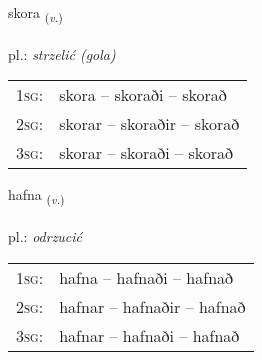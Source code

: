 \documentclass[frontgrid, backgrid]{flacards}\usepackage[]{graphicx}\usepackage[]{xcolor}
\begin{document}
\renewcommand{\flhead}{\vskip5pt \fboxsep=0pt {\small\bfseries\footnotesize Sagnorð | Verb}}
\renewcommand{\fcfoot}{\vskip5pt \fboxsep=0pt \hspace{2pt}{\small\bfseries\footnotesize 1K}}

\renewcommand{\blhead}{\vskip5pt {\small\bfseries\footnotesize Sagnorð | Verb }}
\renewcommand{\bcfoot}{\vskip5pt \hspace{2pt}{\small\bfseries\footnotesize 1K}}


{skora \small{\textsubscript{(\textit{v.})}} \\[1ex] %
\textphonetic{[skɔːra]} \\
pl.: \emph{strzelić (gola)} \\  [2ex]
\renewcommand*{\arraystretch}{0.8}
\begin{tabular}{p{1cm}l}
\textsc{1sg}: & skora -- skoraði -- skorað \\ 
\textsc{2sg}: & skorar -- skoraðir -- skorað \\ 
\textsc{3sg}: & skorar -- skoraði -- skorað \\ 
\end{tabular}
}

\renewcommand{\flhead}{\vskip5pt \fboxsep=0pt {\small\bfseries\footnotesize Sagnorð | Verb}}
\renewcommand{\fcfoot}{\vskip5pt \fboxsep=0pt \hspace{2pt}{\small\bfseries\footnotesize 1K}}

\renewcommand{\blhead}{\vskip5pt {\small\bfseries\footnotesize Sagnorð | Verb }}
\renewcommand{\bcfoot}{\vskip5pt \hspace{2pt}{\small\bfseries\footnotesize 1K}}


{hafna \small{\textsubscript{(\textit{v.})}} \\[1ex] %
\textphonetic{[hapna]} \\
pl.: \emph{odrzucić} \\  [2ex]
\renewcommand*{\arraystretch}{0.8}
\begin{tabular}{p{1cm}l}
\textsc{1sg}: & hafna -- hafnaði -- hafnað \\ 
\textsc{2sg}: & hafnar -- hafnaðir -- hafnað \\ 
\textsc{3sg}: & hafnar -- hafnaði -- hafnað \\ 
\end{tabular}
}
\end{document}
